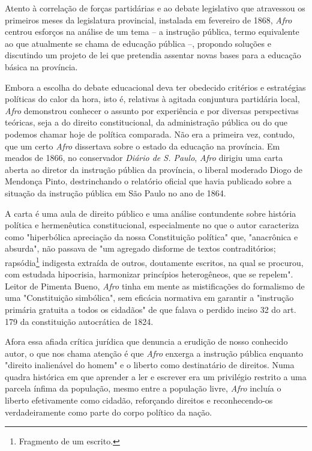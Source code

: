 Atento à correlação de forças partidárias e ao debate legislativo que
atravessou os primeiros meses da legislatura provincial, instalada em
fevereiro de 1868, \emph{Afro} centrou esforços na análise de um tema --
a instrução pública, termo equivalente ao que atualmente se chama de
educação pública --, propondo soluções e discutindo um projeto de lei
que pretendia assentar novas bases para a educação básica na província.

Embora a escolha do debate educacional deva ter obedecido critérios e
estratégias políticas do calor da hora, isto é, relativas à agitada
conjuntura partidária local, \emph{Afro} demonstrou conhecer o assunto
por experiência e por diversas perspectivas teóricas, seja a do direito
constitucional, da administração pública ou do que podemos chamar hoje
de política comparada. Não era a primeira vez, contudo, que um certo
\emph{Afro} dissertava sobre o estado da educação na província. Em
meados de 1866, no conservador \emph{Diário de S. Paulo}, \emph{Afro}
dirigiu uma carta aberta ao diretor da instrução pública da província, o
liberal moderado Diogo de Mendonça Pinto, destrinchando o relatório
oficial que havia publicado sobre a situação da instrução pública em São
Paulo no ano de 1864.

A carta é uma aula de direito público e uma análise contundente sobre
história política e hermenêutica constitucional, especialmente no que o
autor caracteriza como "hiperbólica apreciação da nossa Constituição
política" que, "anacrônica e absurda", não passava de "um agregado
disforme de textos contraditórios; rapsódia\footnote{Fragmento de um
  escrito.} indigesta extraída de outros, doutamente escritos, na qual
se procurou, com estudada hipocrisia, harmonizar princípios
heterogêneos, que se repelem". Leitor de Pimenta Bueno, \emph{Afro}
tinha em mente as mistificações do formalismo de uma "Constituição
simbólica", sem eficácia normativa em garantir a "instrução primária
gratuita a todos os cidadãos" de que falava o perdido inciso 32 do art.
179 da constituição autocrática de 1824.

Afora essa afiada crítica jurídica que denuncia a erudição de nosso
conhecido autor, o que nos chama atenção é que \emph{Afro} enxerga a
instrução pública enquanto "direito inalienável do homem" e o liberto
como destinatário de direitos. Numa quadra histórica em que aprender a
ler e escrever era um privilégio restrito a uma parcela ínfima da
população, mesmo entre a população livre, \emph{Afro} incluía o liberto
efetivamente como cidadão, reforçando direitos e reconhecendo-os
verdadeiramente como parte do corpo político da nação.

